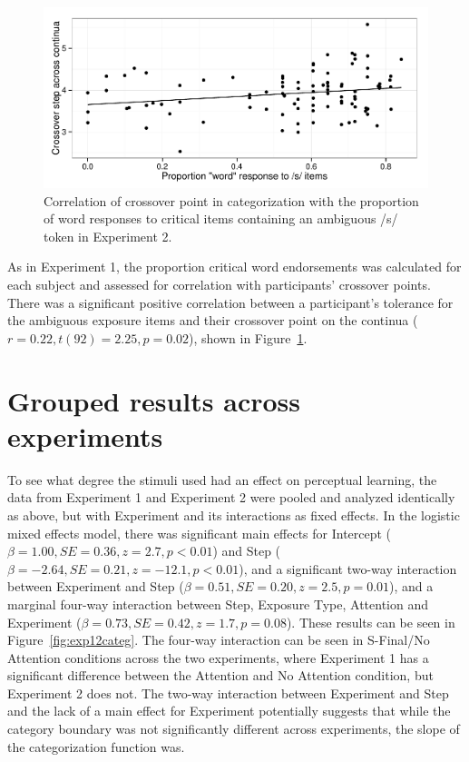 \begin{figure}[!ht]

\caption{Correlation of crossover point in categorization with the proportion of word responses to critical items containing an ambiguous /s/ token in Experiment 2.}\label{fig:exp2xover}
\begin{center}
\includegraphics[width=\textwidth]{graphs/exp2_xoverwordresp}
\end{center}
\end{figure}

As in Experiment 1,  the proportion critical word endorsements was calculated for each subject and assessed for correlation with participants' crossover points. There was a significant positive correlation between a participant's tolerance for the ambiguous exposure items and their crossover point on the continua ($r = 0.22, t (92) = 2.25, p = 0.02$), shown in Figure~\ref{fig:exp2xover}.  

\section{Grouped results across experiments}

To see what degree the stimuli used had an effect on perceptual learning, the data from Experiment 1 and Experiment 2 were pooled and analyzed identically as above, but with Experiment and its interactions as fixed effects.  
In the logistic mixed effects model, there was significant main effects for Intercept ($\beta = 1.00, SE = 0.36, z = 2.7, p < 0.01$) and Step ($\beta = -2.64, SE = 0.21, z = -12.1, p < 0.01$), and a significant two-way interaction between Experiment and Step ($\beta = 0.51, SE = 0.20, z = 2.5, p = 0.01$), and a marginal four-way interaction between Step, Exposure Type, Attention and Experiment ($\beta = 0.73, SE = 0.42, z = 1.7, p = 0.08$).  
These results can be seen in Figure~\ref{fig:exp12categ}.  
The four-way interaction can be seen in S-Final/No Attention conditions across the two experiments, where Experiment 1 has a significant difference between the Attention and No Attention condition, but Experiment 2 does not.  
The two-way interaction between Experiment and Step and the lack of a main effect for Experiment potentially suggests that while the category boundary was not significantly different across experiments, the slope of the categorization function was.


